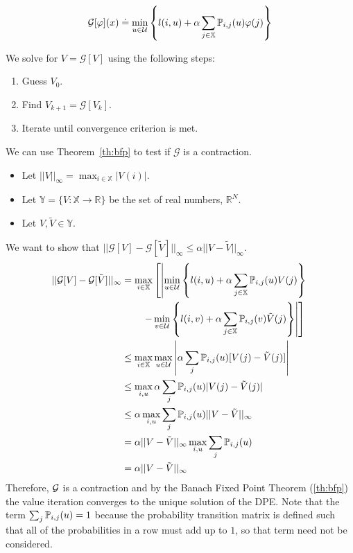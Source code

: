 \begin{equation*}
\mathcal{G}[\varphi](x) \doteq \min_{u\in\mathcal{U}}\left\lbrace l(i,u)+\alpha\sum_{j\in\mathbb{X}}\mathbb{P}_{i,j}(u)\varphi(j)\right\rbrace
\end{equation*}

We solve for $V=\mathcal{G}[V]$ using the following steps:
\begin{enumerate}
\item Guess $V_0$.
\item Find $V_{k+1}=\mathcal{G}[V_k]$.
\item Iterate until convergence criterion is met.
\end{enumerate}

We can use Theorem~\ref{th:bfp} to test if $\mathcal{G}$ is a contraction.
\begin{itemize}
\item Let $||V||_\infty = \max_{i\in\mathbb{X}}|V(i)|$.
\item Let $\mathbb{Y}=\{V:\mathbb{X}\to\mathbb{R}\}$ be the set of real numbers, $\mathbb{R}^N$.
\item Let $V,\tilde{V}\in\mathbb{Y}$.
\end{itemize}
We want to show that $||\mathcal{G}[V]-\mathcal{G}[\tilde{V}]||_\infty\leq\alpha||V-\tilde{V}||_\infty$.
\begin{align*}
||\mathcal{G}[V]-\mathcal{G}[\tilde{V}]||_\infty &= \max_{i\in\mathbb{X}}\left[\left|\min_{u\in\mathcal{U}}\left\lbrace l(i,u)+\alpha\sum_{j\in\mathbb{X}}\mathbb{P}_{i,j}(u)V(j)\right\rbrace \right.\right. \\
&\left.\left.\qquad - \min_{v\in\mathcal{U}}\left\lbrace l(i,v)+\alpha\sum_{j\in\mathbb{X}}\mathbb{P}_{i,j}(v)\tilde{V}(j)\right\rbrace \right|\right] \\
&\leq \max_{i\in\mathbb{X}}\max_{u\in\mathcal{U}}\left|\alpha\sum_j\mathbb{P}_{i,j}(u)[V(j)-\tilde{V}(j)]\right| \\
&\leq \max_{i,u}\alpha\sum_j\mathbb{P}_{i,j}(u)|V(j)-\tilde{V}(j)| \\
&\leq \alpha\max_{i,u}\sum_j\mathbb{P}_{i,j}(u)||V-\tilde{V}||_\infty \\
&= \alpha||V-\tilde{V}||_\infty\max_{i,u}\sum_j\mathbb{P}_{i,j}(u) \\
&= \alpha||V-\tilde{V}||_\infty
\end{align*}
Therefore, $\mathcal{G}$ is a contraction and by the Banach Fixed Point Theorem (\ref{th:bfp}) the value iteration converges to the unique solution of the DPE\@.
Note that the term $\sum_j\mathbb{P}_{i,j}(u)=1$ because the probability transition matrix is defined such that all of the probabilities in a row must add up to $1$, so that term need not be considered.

